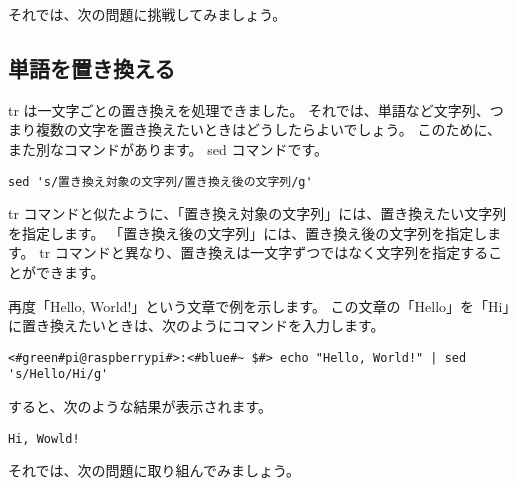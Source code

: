 それでは、次の問題に挑戦してみましょう。
\begin{enumerate}
\end{enumerate}

\subsection{単語を置き換える}
tr は一文字ごとの置き換えを処理できました。
それでは、単語など文字列、つまり複数の文字を置き換えたいときはどうしたらよいでしょう。
このために、また別なコマンドがあります。
sed コマンドです。

\begin{lstlisting}[caption=sed コマンドの基本的な使い方, label=sed_usage]
sed 's/置き換え対象の文字列/置き換え後の文字列/g'
\end{lstlisting}

tr コマンドと似たように、「置き換え対象の文字列」には、置き換えたい文字列を指定します。
「置き換え後の文字列」には、置き換え後の文字列を指定します。
tr コマンドと異なり、置き換えは一文字ずつではなく文字列を指定することができます。

再度「Hello, World!」という文章で例を示します。
この文章の「Hello」を「Hi」に置き換えたいときは、次のようにコマンドを入力します。

\begin{lstlisting}[caption=sed コマンドを使った例, label=sed_app]
<#green#pi@raspberrypi#>:<#blue#~ $#> echo "Hello, World!" | sed 's/Hello/Hi/g'
\end{lstlisting}

すると、次のような結果が表示されます。

\begin{lstlisting}[caption=sed コマンドで変換した結果, label=sed_result]
Hi, Wowld!
\end{lstlisting}

それでは、次の問題に取り組んでみましょう。

\begin{enumerate}
\end{enumerate}

